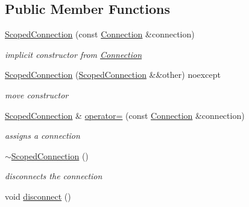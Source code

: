 \subsection*{Public Member Functions}
\begin{DoxyCompactItemize}
\item 
\hyperlink{classndn_1_1util_1_1signal_1_1ScopedConnection_ab63a5bb8ff287c5be7688f14abc6c5a9}{Scoped\+Connection} (const \hyperlink{classndn_1_1util_1_1signal_1_1Connection}{Connection} \&connection)
\begin{DoxyCompactList}\small\item\em implicit constructor from \hyperlink{classndn_1_1util_1_1signal_1_1Connection}{Connection} \end{DoxyCompactList}\item 
\hyperlink{classndn_1_1util_1_1signal_1_1ScopedConnection_af2a4f1e36f252c6d95973c2d3bc16cfd}{Scoped\+Connection} (\hyperlink{classndn_1_1util_1_1signal_1_1ScopedConnection}{Scoped\+Connection} \&\&other) noexcept\hypertarget{classndn_1_1util_1_1signal_1_1ScopedConnection_af2a4f1e36f252c6d95973c2d3bc16cfd}{}\label{classndn_1_1util_1_1signal_1_1ScopedConnection_af2a4f1e36f252c6d95973c2d3bc16cfd}

\begin{DoxyCompactList}\small\item\em move constructor \end{DoxyCompactList}\item 
\hyperlink{classndn_1_1util_1_1signal_1_1ScopedConnection}{Scoped\+Connection} \& \hyperlink{classndn_1_1util_1_1signal_1_1ScopedConnection_a93bebd7b755bf29b7d14ee0420e8d1b2}{operator=} (const \hyperlink{classndn_1_1util_1_1signal_1_1Connection}{Connection} \&connection)
\begin{DoxyCompactList}\small\item\em assigns a connection \end{DoxyCompactList}\item 
\hyperlink{classndn_1_1util_1_1signal_1_1ScopedConnection_adb31a6c16ed18f73e8d95a1578423b9b}{$\sim$\+Scoped\+Connection} ()\hypertarget{classndn_1_1util_1_1signal_1_1ScopedConnection_adb31a6c16ed18f73e8d95a1578423b9b}{}\label{classndn_1_1util_1_1signal_1_1ScopedConnection_adb31a6c16ed18f73e8d95a1578423b9b}

\begin{DoxyCompactList}\small\item\em disconnects the connection \end{DoxyCompactList}\item 
void \hyperlink{classndn_1_1util_1_1signal_1_1ScopedConnection_a81d1fc31aaaa1ed42ff0c218f94691e5}{disconnect} ()\hypertarget{classndn_1_1util_1_1signal_1_1ScopedConnection_a81d1fc31aaaa1ed42ff0c218f94691e5}{}\label{classndn_1_1util_1_1signal_1_1ScopedConnection_a81d1fc31aaaa1ed42ff0c218f94691e5}


\end{DoxyCompactItemize}
